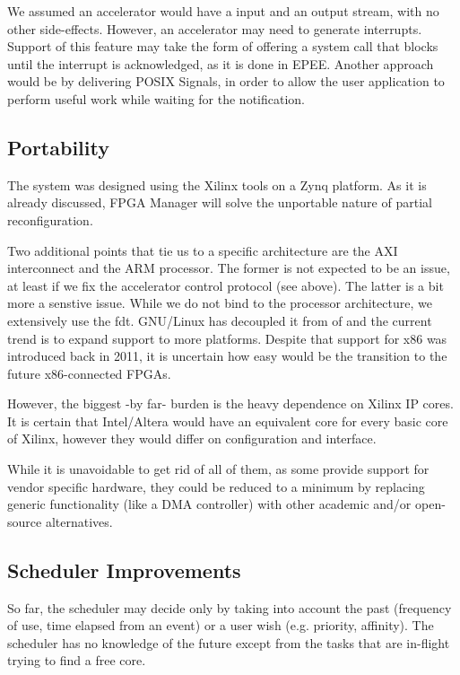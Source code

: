 We assumed an accelerator would have a input and an output stream, with no other side-effects.
However, an accelerator may need to generate interrupts. Support of this feature may take the form of
offering a system call that blocks until the interrupt is acknowledged, as it is done in EPEE\cite{epee}.
Another approach would be by delivering POSIX Signals, in order to allow the user application to perform
useful work while waiting for the notification.

\subsection{Portability}

The system was designed using the Xilinx tools on a Zynq platform. As it is already discussed, FPGA Manager will
solve the unportable nature of partial reconfiguration. 

Two additional points that tie us to a specific architecture are the AXI interconnect and the ARM processor.
The former is not expected to be an issue, at least if we fix the accelerator control protocol (see above).
The latter is a bit more a senstive issue. While we do not bind to the processor architecture, we extensively use
the \gls{fdt}. GNU/Linux has decoupled it from \gls{of} and the current trend is to expand support to more platforms.
Despite that support for x86 was introduced back in 2011, it is uncertain how easy would be the transition to
the future x86-connected FPGAs.

However, the biggest -by far- burden is the heavy dependence on Xilinx IP cores. It is certain that
Intel/Altera would have an equivalent core for every basic core of Xilinx, however they would differ on
configuration and interface.

While it is unavoidable to get rid of all of them, as some provide support for vendor specific hardware,
they could be reduced to a minimum by replacing generic functionality (like a DMA controller) with
other academic and/or open-source alternatives.

\subsection{Scheduler Improvements}

So far, the scheduler may decide only by taking into account the past (frequency of use, time elapsed from an event)
or a user wish (e.g. priority, affinity). The scheduler has no knowledge of the future except from
the tasks that are in-flight trying to find a free core.

